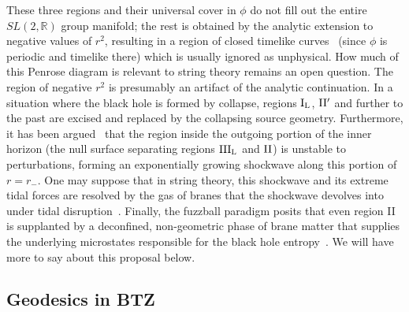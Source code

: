 \documentclass[11pt]{article}
\newcommand{\rcite}{\cite}
\def\sltwo{\ensuremath{SL(2,\bR)}}
\newcommand{\bR}{{\mathbb R}}
\numberwithin{equation}{section}
\begin{document}
These three regions and their universal cover in $\phi$ do not fill out the entire $\sltwo$ group manifold; the rest is obtained by the analytic extension to negative values of $r^2$, resulting in a region of closed timelike curves~\rcite{Hemming:2002kd,Nippanikar:2021skr} (since $\phi$ is periodic and timelike there) which is usually ignored as unphysical.  How much of this Penrose diagram is relevant to string theory remains an open question.  The region of negative $r^2$ is presumably an artifact of the analytic continuation.  In a situation where the black hole is formed by collapse, regions $\rm I_L$, $\rm II'$ and further to the past are excised and replaced by the collapsing source geometry.  Furthermore, it has been argued~\rcite{Marolf:2011dj} that the region inside the outgoing portion of the inner horizon (the null surface separating regions $\rm III_L$ and $\rm II$) is unstable to perturbations, forming an exponentially growing shockwave along this portion of $r=r_-$.  One may suppose that in string theory, this shockwave and its extreme tidal forces are resolved by the gas of branes that the shockwave devolves into under tidal disruption~\rcite{Horowitz:1990sr,Martinec:2020cml}.   Finally, the fuzzball paradigm posits that even region II is supplanted by a deconfined, non-geometric phase of brane matter that supplies the underlying microstates responsible for the black hole entropy~\rcite{Mathur:2005zp}.  We will have more to say about this proposal below.




\subsection{Geodesics in BTZ}
\label{sec:geodesics}
\end{document}
